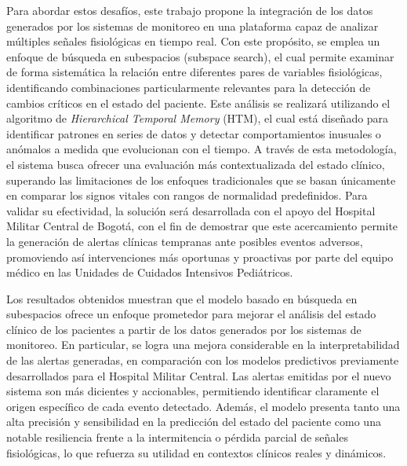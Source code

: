 Para abordar estos desafíos, este trabajo propone la integración de los datos generados por los sistemas de monitoreo en una plataforma capaz de analizar múltiples señales fisiológicas en tiempo real. Con este propósito, se emplea un enfoque de búsqueda en subespacios (subspace search), el cual permite examinar de forma sistemática la relación entre diferentes pares de variables fisiológicas, identificando combinaciones particularmente relevantes para la detección de cambios críticos en el estado del paciente. Este análisis se realizará utilizando el algoritmo de \textit{Hierarchical Temporal Memory} (HTM), el cual está diseñado para identificar patrones en series de datos y detectar comportamientos inusuales o anómalos a medida que evolucionan con el tiempo. A través de esta metodología, el sistema busca ofrecer una evaluación más contextualizada del estado clínico, superando las limitaciones de los enfoques tradicionales que se basan únicamente en comparar los signos vitales con rangos de normalidad predefinidos. Para validar su efectividad, la solución será desarrollada con el apoyo del Hospital Militar Central de Bogotá, con el fin de demostrar que este acercamiento permite la generación de alertas clínicas tempranas ante posibles eventos adversos, promoviendo así intervenciones más oportunas y proactivas por parte del equipo médico en las Unidades de Cuidados Intensivos Pediátricos.

Los resultados obtenidos muestran que el modelo basado en búsqueda en subespacios ofrece un enfoque prometedor para mejorar el análisis del estado clínico de los pacientes a partir de los datos generados por los sistemas de monitoreo. En particular, se logra una mejora considerable en la interpretabilidad de las alertas generadas, en comparación con los modelos predictivos previamente desarrollados para el Hospital Militar Central. Las alertas emitidas por el nuevo sistema son más dicientes y accionables, permitiendo identificar claramente el origen específico de cada evento detectado. Además, el modelo presenta tanto una alta precisión y sensibilidad en la predicción del estado del paciente como una notable resiliencia frente a la intermitencia o pérdida parcial de señales fisiológicas, lo que refuerza su utilidad en contextos clínicos reales y dinámicos.